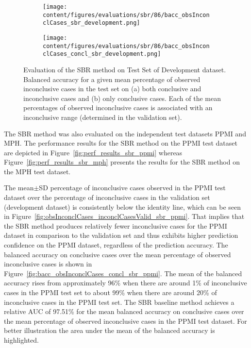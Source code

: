 \begin{figure}[ht]
    \begin{subfigure}{0.9\textwidth}
      \centering
      \texttt{[image: content/figures/evaluations/sbr/86/bacc\_obsInconclCases\_sbr\_development.png]}
      \subcaption{}
      \label{fig:bacc_obsInconclCases_sbr_development}
    \end{subfigure}
    \hfill
    \begin{subfigure}{0.9\textwidth}
      \centering
      \texttt{[image: content/figures/evaluations/sbr/86/bacc\_obsInconclCases\_concl\_sbr\_development.png]}
      \subcaption{}
      \label{fig:bacc_obsInconclCases_concl_sbr_development}
    \end{subfigure}

    \caption{Evaluation of the SBR method on Test Set of Development dataset.
    Balanced accuracy for a given mean percentage of observed inconclusive cases in the test set on 
    (a) both conclusive and inconclusive cases and (b) only conclusive cases. 
    Each of the mean percentages of observed inconclusive cases is associated with an inconclusive range (determined in the validation set). }
    \label{fig:bacc_obsInconclCases_sbr_development_full}
\end{figure}



The SBR method was also evaluated on the independent test datasets PPMI and MPH.
The performance results for the SBR method on the PPMI test dataset are depicted in Figure~\ref{fig:perf_results_sbr_ppmi} 
whereas Figure~\ref{fig:perf_results_sbr_mph} presents the results for the SBR method on the MPH test dataset.


The mean$\pm$SD percentage of inconclusive cases observed in the PPMI test dataset 
over the percentage of inconclusive cases in the validation set (development dataset) 
is consistently below the identity line, 
which can be seen in Figure~\ref{fig:obsInconclCases_inconclCasesValid_sbr_ppmi}.
That implies that the SBR method produces relatively fewer inconclusive cases for the PPMI dataset  
in comparison to the validation set and thus exhibits higher prediction confidence on the PPMI dataset, 
regardless of the prediction accuracy.
The balanced accuracy on conclusive cases over the mean percentage of observed inconclusive cases is shown 
in Figure~\ref{fig:bacc_obsInconclCases_concl_sbr_ppmi}.
The mean of the balanced accuracy rises from approximately 96\% 
when there are around 1\% of inconclusive cases in the PPMI test set to about 99\% 
when there are around 20\% of inconclusive cases in the PPMI test set.
The SBR baseline method achieves a relative AUC of 97.51\% for the mean balanced accuracy on conclusive cases 
over the mean percentage of observed inconclusive cases in the PPMI test dataset.
For better illustration the area under the mean of the balanced accuracy is highlighted.


